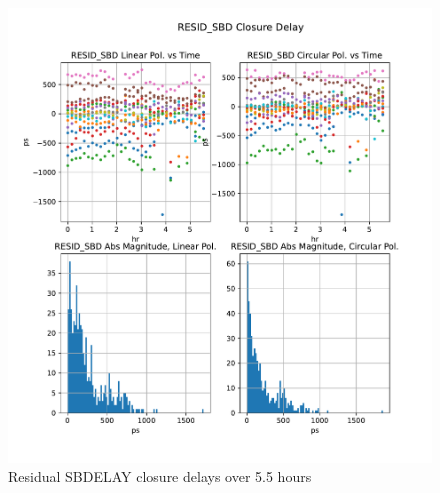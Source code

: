 \documentclass[letterpaper,twoside,12pt]{article}
\begin{document}
\begin{figure}[ht!]
  \begin{center}
  \includegraphics[width=40pc]{RESID_SBD_Closure_Delay.pdf}
  \caption{\small Residual SBDELAY closure delays over 5.5 hours }
  \label{resid_mbd}
  \end{center}
\end{figure}
\end{document}
